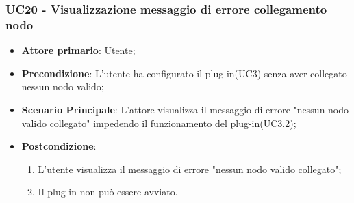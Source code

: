 \subsubsection{UC20 - Visualizzazione messaggio di errore collegamento nodo}
\label{sssec:uc20}
\begin{itemize}
  \item \textbf{Attore primario}: Utente;
  \item \textbf{Precondizione}: L'utente ha configurato il plug-in(UC3) senza aver collegato nessun nodo valido;
  \item \textbf{Scenario Principale}: L'attore visualizza il messaggio di errore "nessun nodo valido collegato" impedendo il funzionamento del plug-in(UC3.2);
  \item \textbf{Postcondizione}:
  \begin{enumerate}
		\item L'utente visualizza il messaggio di errore "nessun nodo valido collegato";
		\item Il plug-in non può essere avviato.
	\end{enumerate}
\end{itemize}
